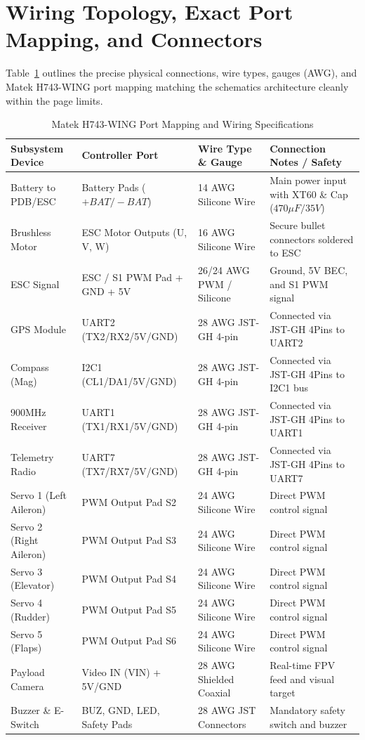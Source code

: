 \documentclass[12pt,a4paper]{article}
\begin{document}
\section{Wiring Topology, Exact Port Mapping, and Connectors}
Table~\ref{tab:wiring_mapping} outlines the precise physical connections, wire types, gauges (AWG), and Matek H743-WING port mapping matching the schematics architecture cleanly within the page limits.

\begin{table}[H]
\centering
\caption{Matek H743-WING Port Mapping and Wiring Specifications}
\label{tab:wiring_mapping}
\footnotesize
\setlength{\tabcolsep}{4pt}
\begin{tabularx}{\textwidth}{@{}p{3.2cm} p{3.5cm} p{2.8cm} X@{}}
\toprule
\textbf{Subsystem Device} & \textbf{Controller Port} & \textbf{Wire Type \& Gauge} & \textbf{Connection Notes / Safety} \\ \midrule
Battery to PDB/ESC & Battery Pads ($+BAT/-BAT$) & 14 AWG Silicone Wire & Main power input with XT60 \& Cap ($470\mu F / 35V$) \\
Brushless Motor & ESC Motor Outputs (U, V, W) & 16 AWG Silicone Wire & Secure bullet connectors soldered to ESC \\
ESC Signal & ESC / S1 PWM Pad + GND + 5V & 26/24 AWG PWM / Silicone & Ground, 5V BEC, and S1 PWM signal \\
GPS Module & UART2 (TX2/RX2/5V/GND) & 28 AWG JST-GH 4-pin & Connected via JST-GH 4Pins to UART2 \\
Compass (Mag) & I2C1 (CL1/DA1/5V/GND) & 28 AWG JST-GH 4-pin & Connected via JST-GH 4Pins to I2C1 bus \\
900MHz Receiver & UART1 (TX1/RX1/5V/GND) & 28 AWG JST-GH 4-pin & Connected via JST-GH 4Pins to UART1 \\
Telemetry Radio & UART7 (TX7/RX7/5V/GND) & 28 AWG JST-GH 4-pin & Connected via JST-GH 4Pins to UART7 \\
Servo 1 (Left Aileron) & PWM Output Pad S2 & 24 AWG Silicone Wire & Direct PWM control signal \\
Servo 2 (Right Aileron) & PWM Output Pad S3 & 24 AWG Silicone Wire & Direct PWM control signal \\
Servo 3 (Elevator) & PWM Output Pad S4 & 24 AWG Silicone Wire & Direct PWM control signal \\
Servo 4 (Rudder) & PWM Output Pad S5 & 24 AWG Silicone Wire & Direct PWM control signal \\
Servo 5 (Flaps) & PWM Output Pad S6 & 24 AWG Silicone Wire & Direct PWM control signal \\
Payload Camera & Video IN (VIN) + 5V/GND & 28 AWG Shielded Coaxial & Real-time FPV feed and visual target \\
Buzzer \& E-Switch & BUZ, GND, LED, Safety Pads & 28 AWG JST Connectors & Mandatory safety switch and buzzer \\ \bottomrule
\end{tabularx}
\end{table}
\end{document}
